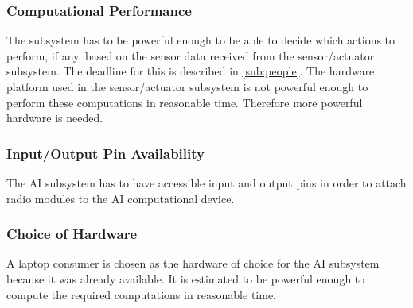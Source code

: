 \subsubsection{Computational Performance}
The subsystem has to be powerful enough to be able to decide which actions to perform, if any, based on the sensor data received from the sensor/actuator subsystem. The deadline for this is described in \cref{sub:people}. The hardware platform used in the sensor/actuator subsystem is not powerful enough to perform these computations in reasonable time. Therefore more powerful hardware is needed.

\subsubsection{Input/Output Pin Availability}
The AI subsystem has to have accessible input and output pins in order to attach radio modules to the AI computational device.

\subsubsection{Choice of Hardware}
A laptop consumer is chosen as the hardware of choice for the AI subsystem because it was already available. It is estimated to be powerful enough to compute the required computations in reasonable time.
